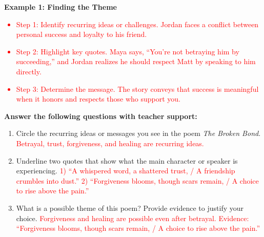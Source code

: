 \documentclass[12pt]{article}
\begin{document}
\vspace{1em}

\begin{tcolorbox}[colframe=black!60, colback=white, 
coltitle=black, colbacktitle=black!15, fonttitle=\bfseries\Large, 
title=Examples, halign title=center, left=10pt, right=10pt, top=10pt, bottom=15pt]

\textbf{Example 1: Finding the Theme}  
\textcolor{red}{
\begin{itemize}
    \item Step 1: Identify recurring ideas or challenges. Jordan faces a conflict between personal success and loyalty to his friend.
    \item Step 2: Highlight key quotes. Maya says, “You’re not betraying him by succeeding,” and Jordan realizes he should respect Matt by speaking to him directly.
    \item Step 3: Determine the message. The story conveys that success is meaningful when it honors and respects those who support you.
\end{itemize}
}

\end{tcolorbox}

\vspace{1em}

\begin{tcolorbox}[colframe=black!60, colback=white, 
coltitle=black, colbacktitle=black!15, fonttitle=\bfseries\Large, 
title=Guided Practice, halign title=center, left=10pt, right=10pt, top=10pt, bottom=15pt]

\textbf{Answer the following questions with teacher support:}
\begin{enumerate}[itemsep=1em]
    \item Circle the recurring ideas or messages you see in the poem \textit{The Broken Bond}.
    \textcolor{red}{Betrayal, trust, forgiveness, and healing are recurring ideas.}
    \item Underline two quotes that show what the main character or speaker is experiencing.
    \textcolor{red}{1) “A whispered word, a shattered trust, / A friendship crumbles into dust.” 2) “Forgiveness blooms, though scars remain, / A choice to rise above the pain.”}
    \item What is a possible theme of this poem? Provide evidence to justify your choice.
    \textcolor{red}{Forgiveness and healing are possible even after betrayal. Evidence: “Forgiveness blooms, though scars remain, / A choice to rise above the pain.”}
\end{enumerate}
\end{tcolorbox}
\end{document}
